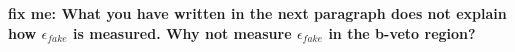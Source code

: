 

{\bf fix me: What you have written in the next paragraph does not explain how $\epsilon_{fake}$ is measured.
Why not measure $\epsilon_{fake}$ in the b-veto region?}

